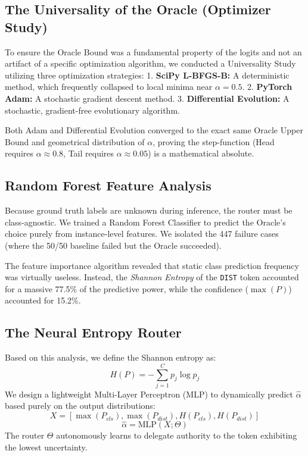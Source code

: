 \documentclass[10pt,twocolumn,letterpaper]{article}
\begin{document}
\subsection{The Universality of the Oracle (Optimizer Study)}
To ensure the Oracle Bound was a fundamental property of the logits and not an artifact of a specific optimization algorithm, we conducted a Universality Study utilizing three optimization strategies:
1.  \textbf{SciPy L-BFGS-B:} A deterministic method, which frequently collapsed to local minima near $\alpha = 0.5$.
2.  \textbf{PyTorch Adam:} A stochastic gradient descent method.
3.  \textbf{Differential Evolution:} A stochastic, gradient-free evolutionary algorithm.

Both Adam and Differential Evolution converged to the exact same Oracle Upper Bound and geometrical distribution of $\alpha$, proving the step-function (Head requires $\alpha \approx 0.8$, Tail requires $\alpha \approx 0.05$) is a mathematical absolute.

\subsection{Random Forest Feature Analysis}
Because ground truth labels are unknown during inference, the router must be class-agnostic. We trained a Random Forest Classifier to predict the Oracle's choice purely from instance-level features. We isolated the 447 failure cases (where the 50/50 baseline failed but the Oracle succeeded).

The feature importance algorithm revealed that static class prediction frequency was virtually useless. Instead, the \textit{Shannon Entropy} of the \texttt{DIST} token accounted for a massive 77.5\% of the predictive power, while the confidence ($\max(P)$) accounted for 15.2\%.

\subsection{The Neural Entropy Router}
Based on this analysis, we define the Shannon entropy as:
\begin{equation}
    H(P) = -\sum_{j=1}^{C} p_j \log p_j
\end{equation}
We design a lightweight Multi-Layer Perceptron (MLP) to dynamically predict $\hat{\alpha}$ based purely on the output distributions:
\begin{equation}
    X = [ \max(P_{cls}), \max(P_{dist}), H(P_{cls}), H(P_{dist}) ]
\end{equation}
\begin{equation}
    \hat{\alpha} = \text{MLP}(X; \Theta)
\end{equation}
The router $\Theta$ autonomously learns to delegate authority to the token exhibiting the lowest uncertainty.
\end{document}

